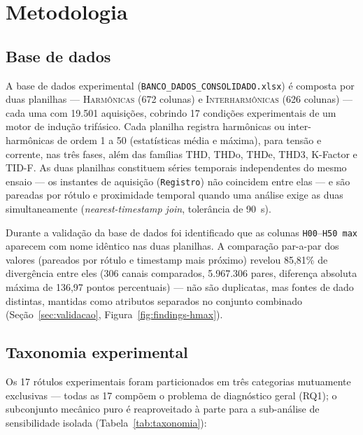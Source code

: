 \documentclass[12pt,a4paper]{report}
\begin{document}
\chapter{Metodologia}

\section{Base de dados}

A base de dados experimental (\texttt{BANCO\_DADOS\_CONSOLIDADO.xlsx}) é
composta por duas planilhas — \textsc{Harmônicas} (672 colunas) e
\textsc{Interharmônicas} (626 colunas) — cada uma com 19.501 aquisições,
cobrindo 17 condições experimentais de um motor de indução trifásico. Cada
planilha registra harmônicas ou inter-harmônicas de ordem 1 a 50 (estatísticas
média e máxima), para tensão e corrente, nas três fases, além das famílias
THD, THDo, THDe, THD3, K-Factor e TID-F. As duas planilhas constituem séries
temporais independentes do mesmo ensaio — os instantes de aquisição
(\texttt{Registro}) não coincidem entre elas — e são pareadas por rótulo e
proximidade temporal quando uma análise exige as duas simultaneamente
(\emph{nearest-timestamp join}, tolerância de 90~s).

Durante a validação da base de dados foi identificado que as colunas
\texttt{H00}--\texttt{H50~max} aparecem com nome idêntico nas duas planilhas.
A comparação par-a-par dos valores (pareados por rótulo e timestamp mais
próximo) revelou 85,81\% de divergência entre eles (306 canais comparados,
5.967.306 pares, diferença absoluta máxima de 136,97 pontos percentuais) —
não são duplicatas, mas fontes de dado distintas, mantidas como atributos
separados no conjunto combinado (Seção~\ref{sec:validacao}, Figura~\ref{fig:findings-hmax}).

\section{Taxonomia experimental}
\label{sec:taxonomia}

Os 17 rótulos experimentais foram particionados em três categorias
mutuamente exclusivas — todas as 17 compõem o problema de diagnóstico geral
(RQ1); o subconjunto mecânico puro é reaproveitado à parte para a
sub-análise de sensibilidade isolada (Tabela~\ref{tab:taxonomia}):
\end{document}
